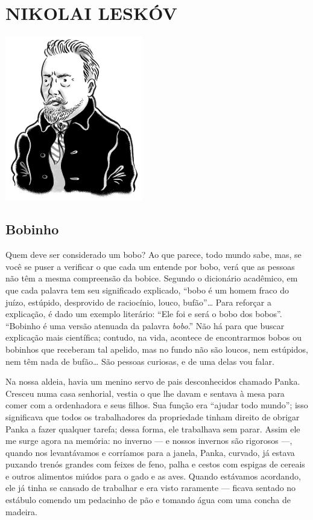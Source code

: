 \part[NIKOLAI LESKÓV]{NIKOLAI LESKÓV }

\pagebreak
\thispagestyle{empty}
\mbox{}
\vfill
\begin{center}
\includegraphics[width=6cm]{./imgs/autor5.jpg}
\end{center}


\chapter{Bobinho} \label{part5}

Quem deve ser considerado um bobo? Ao que parece, todo mundo sabe, mas,
se você se puser a verificar o que cada um entende por bobo, verá que as
pessoas não têm a mesma compreensão da bobice. Segundo o dicionário
acadêmico, em que cada palavra tem seu significado explicado, ``bobo é
um homem fraco do juízo, estúpido, desprovido de raciocínio, louco,
bufão''\ldots{} Para reforçar a explicação, é dado um exemplo literário:
``Ele foi e será o bobo dos bobos''. ``Bobinho é uma versão atenuada da
palavra \emph{bobo}.'' Não há para que buscar explicação mais
científica; contudo, na vida, acontece de encontrarmos bobos ou bobinhos
que receberam tal apelido, mas no fundo não são loucos, nem estúpidos,
nem têm nada de bufão\ldots{} São pessoas curiosas, e de uma delas vou falar.

Na nossa aldeia, havia um menino servo de pais desconhecidos chamado
Panka. Cresceu numa casa senhorial, vestia o que lhe davam e sentava à
mesa para comer com a ordenhadora e seus filhos. Sua função era ``ajudar
todo mundo''; isso significava que todos os trabalhadores da propriedade
tinham direito de obrigar Panka a fazer qualquer tarefa; dessa forma,
ele trabalhava sem parar. Assim ele me surge agora na memória: no
inverno --- e nossos invernos são rigorosos ---, quando nos levantávamos
e corríamos para a janela, Panka, curvado, já estava puxando trenós
grandes com feixes de feno, palha e cestos com espigas de cereais e
outros alimentos miúdos para o gado e as aves. Quando estávamos
acordando, ele já tinha se cansado de trabalhar e era visto raramente
--- ficava sentado no estábulo comendo um pedacinho de pão e tomando
água com uma concha de madeira.

